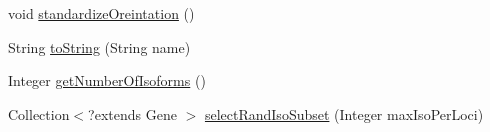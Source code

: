 \begin{DoxyCompactItemize}
\item 
void \hyperlink{classbroad_1_1pda_1_1gene_1_1_gene_with_isoforms_a77c6049bcb70edc00376b968f0219c5e}{standardize\+Oreintation} ()
\item 
String \hyperlink{classbroad_1_1pda_1_1gene_1_1_gene_with_isoforms_ade40fe0ddd584f1468f5664ea255b94c}{to\+String} (String name)
\item 
Integer \hyperlink{classbroad_1_1pda_1_1gene_1_1_gene_with_isoforms_a3485eb306e62f1964875debc376a0276}{get\+Number\+Of\+Isoforms} ()
\item 
Collection$<$?extends Gene $>$ \hyperlink{classbroad_1_1pda_1_1gene_1_1_gene_with_isoforms_a81ed0377315d9630a740515935f554ef}{select\+Rand\+Iso\+Subset} (Integer max\+Iso\+Per\+Loci)
\end{DoxyCompactItemize}


